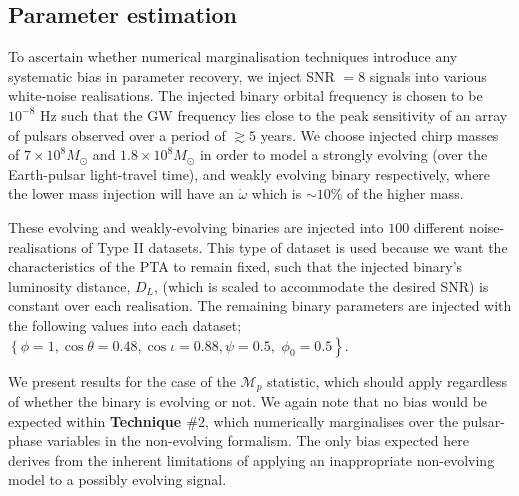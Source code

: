 \documentclass[twocolappendix,tighten]{emulateapj}
\begin{document}
\subsection{Parameter estimation}

To ascertain whether numerical marginalisation techniques introduce any systematic bias in parameter recovery, we inject SNR $=8$ signals into various white-noise realisations. The injected binary orbital frequency is chosen to be $10^{-8}$ Hz such that the GW frequency lies close to the peak sensitivity of an array of pulsars observed over a period of $\gtrsim 5$ years. We choose injected chirp masses of $7\times 10^8M_{\odot}$ and $1.8\times 10^8M_{\odot}$ in order to model a strongly evolving (over the Earth-pulsar light-travel time), and weakly evolving binary respectively, where the lower mass injection will have an $\dot\omega$ which is $\sim 10\%$ of the higher mass.

These evolving and weakly-evolving binaries are injected into $100$ different noise-realisations of Type II datasets. This type of dataset is used because we want the characteristics of the PTA to remain fixed, such that the injected binary's luminosity distance, $D_L$, (which is scaled to accommodate the desired SNR) is constant over each realisation. The remaining binary parameters are injected with the following values into each dataset; $\left\{\phi=1,\cos\theta=0.48,\cos\iota=0.88,\psi=0.5,\right.$ $\left.\phi_0=0.5\right\}$. %

We present results for the case of the {\bf $\mathcal{M}_p$} statistic, which should apply regardless of whether the binary is evolving or not. We again note that no bias would be expected within {\bf Technique $\#2$}, which numerically marginalises over the pulsar-phase variables in the non-evolving formalism. The only bias expected here derives from the inherent limitations of applying an inappropriate non-evolving model to a possibly evolving signal. 

\end{document}
